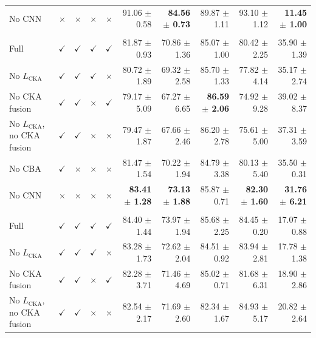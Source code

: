 \documentclass[10pt]{article}
\begin{document}
{\begin{longtable}{lcccc rrrrr}
No CNN & $\times$ & $\times$ & $\times$ & $\times$ & 91.06 $\pm$ 0.58 & \textbf{84.56 $\pm$ 0.73} & 89.87 $\pm$ 1.11 & 93.10 $\pm$ 1.12 & \textbf{11.45 $\pm$ 1.00} \\
\addlinespace[4pt]
\multicolumn{10}{l}{\textit{Source: OVATUS $\rightarrow$ Target: USOVA}} \\
\midrule
Full & $\checkmark$ & $\checkmark$ & $\checkmark$ & $\checkmark$ & 81.87 $\pm$ 0.93 & 70.86 $\pm$ 1.36 & 85.07 $\pm$ 1.00 & 80.42 $\pm$ 2.25 & 35.90 $\pm$ 1.39 \\
No $L_{\mathrm{CKA}}$ & $\checkmark$ & $\checkmark$ & $\checkmark$ & $\times$ & 80.72 $\pm$ 1.89 & 69.32 $\pm$ 2.58 & 85.70 $\pm$ 1.33 & 77.82 $\pm$ 4.14 & 35.17 $\pm$ 2.74 \\
No CKA fusion & $\checkmark$ & $\checkmark$ & $\times$ & $\checkmark$ & 79.17 $\pm$ 5.09 & 67.27 $\pm$ 6.65 & \textbf{86.59 $\pm$ 2.06} & 74.92 $\pm$ 9.28 & 39.02 $\pm$ 8.37 \\
No $L_{\mathrm{CKA}}$, no CKA fusion & $\checkmark$ & $\checkmark$ & $\times$ & $\times$ & 79.47 $\pm$ 1.87 & 67.66 $\pm$ 2.46 & 86.20 $\pm$ 2.78 & 75.61 $\pm$ 5.00 & 37.31 $\pm$ 3.59 \\
No CBA & $\checkmark$ & $\times$ & $\times$ & $\times$ & 81.47 $\pm$ 1.54 & 70.22 $\pm$ 1.94 & 84.79 $\pm$ 3.38 & 80.13 $\pm$ 5.40 & 35.50 $\pm$ 0.31 \\
No CNN & $\times$ & $\times$ & $\times$ & $\times$ & \textbf{83.41 $\pm$ 1.28} & \textbf{73.13 $\pm$ 1.88} & 85.87 $\pm$ 0.71 & \textbf{82.30 $\pm$ 1.60} & \textbf{31.76 $\pm$ 6.21} \\
\addlinespace[4pt]
\multicolumn{10}{l}{\textit{Source: USOVA $\rightarrow$ Target: OTU}} \\
\midrule
Full & $\checkmark$ & $\checkmark$ & $\checkmark$ & $\checkmark$ & 84.40 $\pm$ 1.44 & 73.97 $\pm$ 1.94 & 85.68 $\pm$ 2.25 & 84.45 $\pm$ 0.20 & 17.07 $\pm$ 0.88 \\
No $L_{\mathrm{CKA}}$ & $\checkmark$ & $\checkmark$ & $\checkmark$ & $\times$ & 83.28 $\pm$ 1.73 & 72.62 $\pm$ 2.04 & 84.51 $\pm$ 0.92 & 83.94 $\pm$ 2.81 & 17.78 $\pm$ 1.38 \\
No CKA fusion & $\checkmark$ & $\checkmark$ & $\times$ & $\checkmark$ & 82.28 $\pm$ 3.71 & 71.46 $\pm$ 4.69 & 85.02 $\pm$ 0.71 & 81.68 $\pm$ 6.31 & 18.90 $\pm$ 2.86 \\
No $L_{\mathrm{CKA}}$, no CKA fusion & $\checkmark$ & $\checkmark$ & $\times$ & $\times$ & 82.54 $\pm$ 2.17 & 71.69 $\pm$ 2.60 & 82.34 $\pm$ 1.67 & 84.93 $\pm$ 5.17 & 20.82 $\pm$ 2.64 \\

\end{longtable}}
\end{document}
